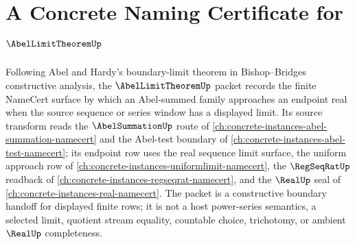 \chapter{A Concrete Naming Certificate for $\AbelLimitTheoremUp$}
\label{ch:concrete-instances-abel-limit-theorem-namecert}

Following Abel and Hardy's boundary-limit theorem in Bishop--Bridges constructive analysis, the $\AbelLimitTheoremUp$ packet records the finite NameCert surface by which an Abel-summed family approaches an endpoint real when the source sequence or series window has a displayed limit. Its source transform reads the $\AbelSummationUp$ route of \autoref{ch:concrete-instances-abel-summation-namecert} and the Abel-test boundary of \autoref{ch:concrete-instances-abel-test-namecert}; its endpoint row uses the real sequence limit surface, the uniform approach row of \autoref{ch:concrete-instances-uniformlimit-namecert}, the $\RegSeqRatUp$ readback of \autoref{ch:concrete-instances-regseqrat-namecert}, and the $\RealUp$ seal of \autoref{ch:concrete-instances-real-namecert}. The packet is a constructive boundary handoff for displayed finite rows; it is not a host power-series semantics, a selected limit, quotient stream equality, countable choice, trichotomy, or ambient $\RealUp$ completeness.

